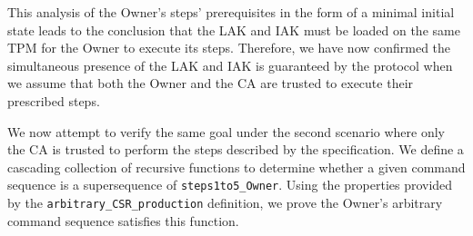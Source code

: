 \documentclass[runningheads]{llncs}
\begin{document}




This analysis of the Owner's steps' prerequisites in the form of a
minimal initial state leads to the conclusion that the LAK and IAK
must be loaded on the same TPM for the Owner to execute its steps.
Therefore, we have now confirmed the simultaneous presence of the LAK
and IAK is guaranteed by the protocol when we assume that both the
Owner and the CA are trusted to execute their prescribed steps.

We now attempt to verify the same goal under the second scenario where
only the CA is trusted to perform the steps described by the specification.
We define a cascading collection of recursive functions to determine
whether a given command sequence is a supersequence of
\verb|steps1to5_Owner|.  Using the properties provided by the
\verb|arbitrary_CSR_production| definition, we prove the Owner's
arbitrary command sequence satisfies this function.

\end{document}
